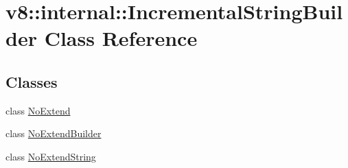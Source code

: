 \hypertarget{classv8_1_1internal_1_1IncrementalStringBuilder}{}\section{v8\+:\+:internal\+:\+:Incremental\+String\+Builder Class Reference}
\label{classv8_1_1internal_1_1IncrementalStringBuilder}
\subsection*{Classes}
\begin{DoxyCompactItemize}
\item 
class \mbox{\hyperlink{classv8_1_1internal_1_1IncrementalStringBuilder_1_1NoExtend}{No\+Extend}}
\item 
class \mbox{\hyperlink{classv8_1_1internal_1_1IncrementalStringBuilder_1_1NoExtendBuilder}{No\+Extend\+Builder}}
\item 
class \mbox{\hyperlink{classv8_1_1internal_1_1IncrementalStringBuilder_1_1NoExtendString}{No\+Extend\+String}}
\end{DoxyCompactItemize}
